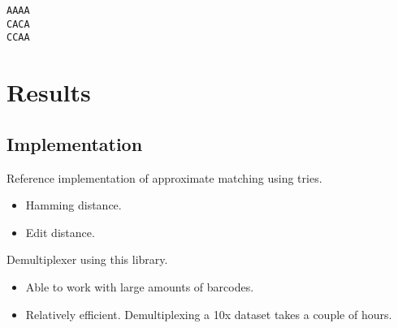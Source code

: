 \documentclass[slidestop]{beamer}
\begin{document}
\begin{pframe}
  \vspace{-7cm}
  \hspace{9.5cm}\vbox{
    \texttt{\color{red}A\color{black}AAA}\\
    \texttt{CA\color{red}C\color{black}A}\\
    \texttt{C\color{red}C\color{black}AA}
  }
\end{pframe}


\section{Results}
\subsection{Implementation}
\begin{pframe}
  Reference implementation of approximate matching using tries.

  \begin{itemize}
    \item Hamming distance.
    \item Edit distance.
  \end{itemize}
  \bigskip

  Demultiplexer using this library.

  \begin{itemize}
    \item Able to work with large amounts of barcodes.
    \item Relatively efficient. Demultiplexing a 10x dataset takes a couple of
      hours.
  \end{itemize}
  \vfill



\end{pframe}


\end{document}
